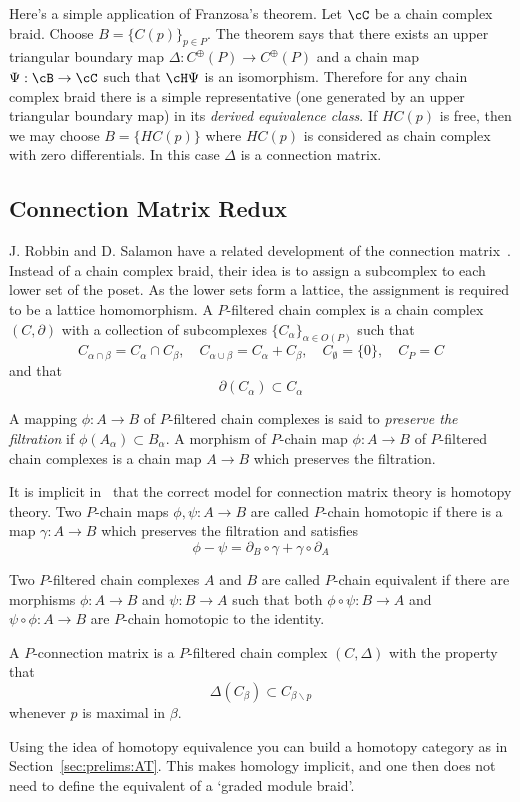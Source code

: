 Here's a simple application of Franzosa's theorem.  Let $\cC$ be a chain complex braid.  Choose $B = \{C(p)\}_{p\in P}$.  The theorem says that there exists an upper triangular boundary map $\Delta:C^\oplus(P)\to C^\oplus(P)$ and a chain map $\Psi:\cB\to \cC$ such that $\cH\Psi$ is an isomorphism.  Therefore for any chain complex braid there is a simple representative (one generated by an upper triangular boundary map) in its {\em derived equivalence class}.  If $HC(p)$ is free, then we may choose $B=\{HC(p)\}$ where $HC(p)$ is considered as chain complex with zero differentials.  In this case $\Delta$ is a connection matrix.


\subsection{Connection Matrix Redux}



J. Robbin and D. Salamon have a related development of the connection matrix~\cite{salamon}.   Instead of a chain complex braid, their idea is to assign a subcomplex to each lower set of the poset.  As the lower sets form a lattice, the assignment is required to be a lattice homomorphism.  A $P$-filtered chain complex is a chain complex $(C,\partial)$ with a collection of subcomplexes $\{C_\alpha\}_{\alpha\in O(P)}$ such that $$C_{\alpha\cap \beta} = C_\alpha\cap C_\beta, \quad C_{\alpha\cup \beta} = C_\alpha + C_\beta,\quad C_\emptyset = \{0\},\quad C_P = C$$ and that $$\partial(C_\alpha)\subset C_\alpha$$

A mapping $\phi:A\to B$ of $P$-filtered chain complexes is said to {\em preserve the filtration} if $\phi(A_\alpha)\subset B_\alpha$.  A morphism of $P$-chain map $\phi:A\to B$ of $P$-filtered chain complexes is a chain map $A\to B$ which preserves the filtration.

It is implicit in~\cite{salamon} that the correct model for connection matrix theory is homotopy theory.    Two $P$-chain maps $\phi,\psi:A\to B$ are called $P$-chain homotopic if there is a map $\gamma:A\to B$ which preserves the filtration and satisfies $$\phi-\psi = \partial_B \circ \gamma + \gamma\circ \partial_A$$

Two $P$-filtered chain complexes $A$ and $B$ are called $P$-chain equivalent if there are morphisms $\phi:A\to B$ and $\psi:B\to A$ such that both $\phi\circ \psi:B\to A$ and $\psi\circ \phi:A\to B$ are $P$-chain homotopic to the identity.  

A $P$-connection matrix is a $P$-filtered chain complex $(C,\Delta)$ with the property that $$\Delta(C_\beta)\subset C_{\beta \backslash p}$$ whenever $p$ is maximal in $\beta$.  

Using the idea of homotopy equivalence you can build a homotopy category as in Section~\ref{sec:prelims:AT}.  This makes homology implicit, and one then does not need to define the equivalent of a `graded module braid'.  

